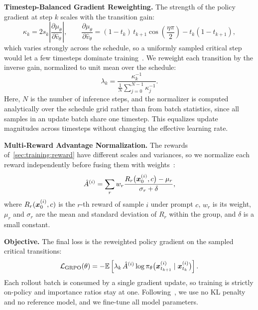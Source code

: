 \noindent\textbf{Timestep-Balanced Gradient Reweighting.}
The strength of the policy gradient at step $k$ scales with the transition gain:
\begin{equation}
\kappa_k = 2 s_k \left| \frac{\partial \mu_\theta}{\partial \hat{v}_\theta} \right|, \qquad
\frac{\partial \mu_\theta}{\partial \hat{v}_\theta} = (1 - t_k)\, t_{k+1} \cos\!\left(\frac{\eta\pi}{2}\right) - t_k (1 - t_{k+1}),
\end{equation}
which varies strongly across the schedule, so a uniformly sampled critical step would let a few timesteps dominate training~\cite{he2026flashgrpo,he2025tempflow,longcatvideo}. We reweight each transition by the inverse gain, normalized to unit mean over the schedule:
\begin{equation}
\lambda_k = \frac{\kappa_k^{-1}}{\frac{1}{N} \sum_{j=0}^{N-1} \kappa_j^{-1}}.
\end{equation}
Here, $N$ is the number of inference steps, and the normalizer is computed analytically over the schedule grid rather than from batch statistics, since all samples in an update batch share one timestep. This equalizes update magnitudes across timesteps without changing the effective learning rate.

\noindent\textbf{Multi-Reward Advantage Normalization.}
The rewards of~\cref{sec:training:reward} have different scales and variances, so we normalize each reward independently before fusing them with weights~\cite{liu2026gdpo}:
\begin{equation}
\hat{A}^{(i)} = \sum_{r} w_r \frac{R_r\big({\bm x}_0^{(i)}, c\big) - \mu_r}{\sigma_r + \delta},
\end{equation}
where $R_r({\bm x}_0^{(i)}, c)$ is the $r$-th reward of sample $i$ under prompt $c$, $w_r$ is its weight, $\mu_r$ and $\sigma_r$ are the mean and standard deviation of $R_r$ within the group, and $\delta$ is a small constant.

\noindent\textbf{Objective.}
The final loss is the reweighted policy gradient on the sampled critical transitions:
\begin{equation}
\mathcal{L}_{\mathrm{GRPO}}(\theta) = - \mathbb{E}\left[ \lambda_k\, \hat{A}^{(i)} \log \pi_\theta\big({\bm x}_{t_{k+1}}^{(i)} \mid {\bm x}_{t_k}^{(i)}\big) \right].
\end{equation}
Each rollout batch is consumed by a single gradient update, so training is strictly on-policy and importance ratios stay at one. Following~\cite{xue2025dancegrpo,he2026flashgrpo,xue2026videoposttrain}, we use no KL penalty and no reference model, and we fine-tune all model parameters.

